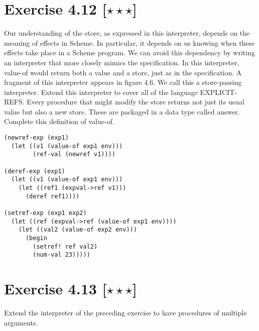 \documentclass[11pt]{article}
\begin{document}
\section*{Exercise 4.12 [$\star \star \star$]}
Our understanding of the store, as expressed in this interpreter,
depends on the meaning of effects in Scheme. In particular, it depends on us knowing
when these effects take place in a Scheme program. We can avoid this dependency by
writing an interpreter that more closely mimics the speciﬁcation. In this interpreter,
value-of would return both a value and a store, just as in the speciﬁcation. A fragment of this interpreter appears in ﬁgure 4.6. We call this a store-passing interpreter.
Extend this interpreter to cover all of the language EXPLICIT-REFS.
Every procedure that might modify the store returns not just its usual value but also a
new store. These are packaged in a data type called answer. Complete this deﬁnition
of value-of.

\begin{lstlisting}
(newref-exp (exp1)
  (let ((v1 (value-of exp1 env)))
        (ref-val (newref v1))))
        
(deref-exp (exp1)
  (let ((v1 (value-of exp1 env)))
    (let ((ref1 (expval->ref v1)))
      (deref ref1))))
      
(setref-exp (exp1 exp2)
  (let ((ref (expval->ref (value-of exp1 env))))
    (let ((val2 (value-of exp2 env)))
      (begin
        (setref! ref val2)
        (num-val 23)))))
\end{lstlisting}

\section*{Exercise 4.13 [$\star \star \star$]}
Extend the interpreter of the preceding exercise to have procedures of multiple arguments.
\end{document}
